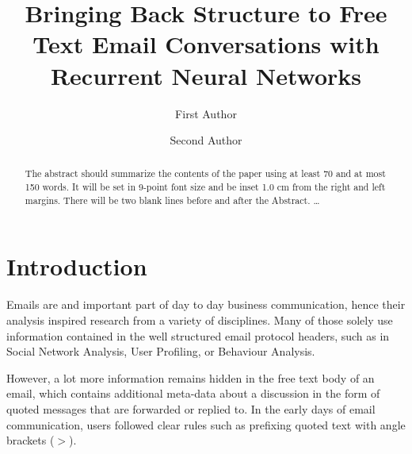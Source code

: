 \documentclass{llncs}
\begin{document}
%
\frontmatter          %
%
\pagestyle{headings}  %

\mainmatter              %
%
\title{Bringing Back Structure to Free Text Email Conversations with Recurrent Neural Networks}
%
%
\author{First Author \and Second Author}
%
%
%


\maketitle              %

\begin{abstract}
The abstract should summarize the contents of the paper
using at least 70 and at most 150 words. It will be set in 9-point
font size and be inset 1.0 cm from the right and left margins.
There will be two blank lines before and after the Abstract. \dots
\end{abstract}
%
\section{Introduction}
Emails are and important part of day to day business communication, hence their analysis inspired research from a variety of disciplines.
Many of those solely use information contained in the well structured email protocol headers, such as in Social Network Analysis, User Profiling, or Behaviour Analysis.

However, a lot more information remains hidden in the free text body of an email, which contains additional meta-data about a discussion in the form of quoted messages that are forwarded or replied to.
In the early days of email communication, users followed clear rules such as prefixing quoted text with angle brackets ($>$).
\end{document}
